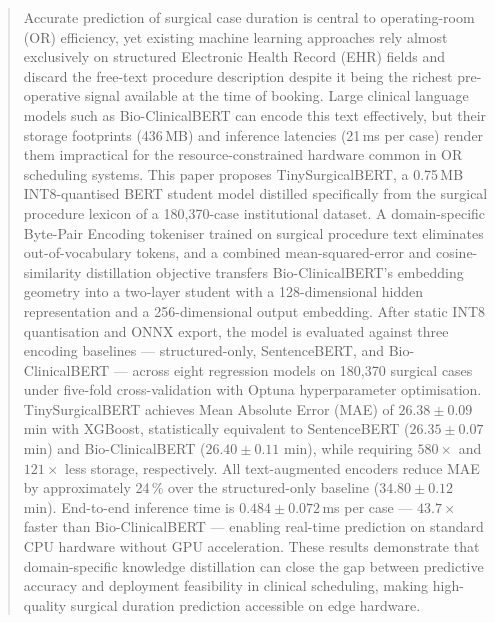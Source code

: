 \documentclass[3p]{elsarticle}
\begin{document}
\begin{frontmatter}
\begin{abstract}
Accurate prediction of surgical case duration is central to operating-room (OR) efficiency, yet existing machine learning approaches rely almost exclusively on structured Electronic Health Record (EHR) fields and discard the free-text procedure description despite it being the richest pre-operative signal available at the time of booking. Large clinical language models such as Bio-ClinicalBERT can encode this text effectively, but their storage footprints (436\,MB) and inference latencies (21\,ms per case) render them impractical for the resource-constrained hardware common in OR scheduling systems. This paper proposes TinySurgicalBERT, a 0.75\,MB INT8-quantised BERT student model distilled specifically from the surgical procedure lexicon of a 180{,}370-case institutional dataset. A domain-specific Byte-Pair Encoding tokeniser trained on surgical procedure text eliminates out-of-vocabulary tokens, and a combined mean-squared-error and cosine-similarity distillation objective transfers Bio-ClinicalBERT's embedding geometry into a two-layer student with a 128-dimensional hidden representation and a 256-dimensional output embedding. After static INT8 quantisation and ONNX export, the model is evaluated against three encoding baselines — structured-only, SentenceBERT, and Bio-ClinicalBERT — across eight regression models on 180{,}370 surgical cases under five-fold cross-validation with Optuna hyperparameter optimisation. TinySurgicalBERT achieves Mean Absolute Error (MAE) of $26.38 \pm 0.09$ min with XGBoost, statistically equivalent to SentenceBERT ($26.35 \pm 0.07$ min) and Bio-ClinicalBERT ($26.40 \pm 0.11$ min), while requiring $580\times$ and $121\times$ less storage, respectively. All text-augmented encoders reduce MAE by approximately 24\,\% over the structured-only baseline ($34.80 \pm 0.12$ min). End-to-end inference time is $0.484 \pm 0.072$\,ms per case --- $43.7\times$ faster than Bio-ClinicalBERT --- enabling real-time prediction on standard CPU hardware without GPU acceleration. These results demonstrate that domain-specific knowledge distillation can close the gap between predictive accuracy and deployment feasibility in clinical scheduling, making high-quality surgical duration prediction accessible on edge hardware.
\end{abstract}

\begin{graphicalabstract}
\end{graphicalabstract}


\end{frontmatter}
\end{document}
